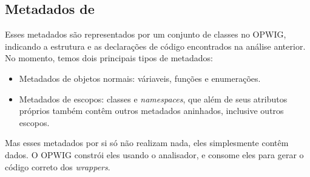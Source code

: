   \subsection{Metadados de \CXX{}}
  Esses metadados são representados por um conjunto de classes no OPWIG, indicando a estrutura e as
  declarações de código \CXX{} encontrados na análise anterior. No momento, temos dois principais
  tipos de metadados:
  \begin{itemize}
    \item Metadados de objetos normais: váriaveis, funções e enumerações.
    \item Metadados de escopos: classes e \textit{namespaces}, que além de seus atributos próprios
      também contêm outros metadados aninhados, inclusive outros escopos.
  \end{itemize}
  
  Mas esses metadados por si só não realizam nada, eles simplesmente contêm dados. O OPWIG constrói 
  eles usando o analisador, e consome eles para gerar o código correto dos \textit{wrappers}.
  
